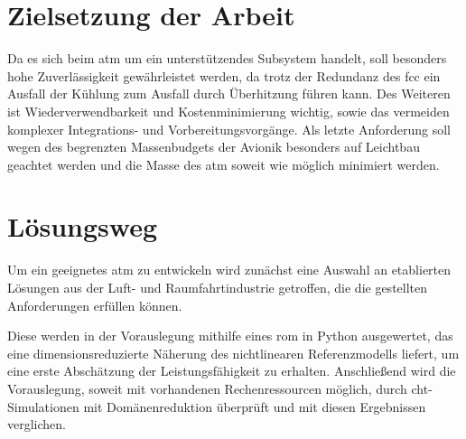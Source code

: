 \section{Zielsetzung der Arbeit}

Da es sich beim \ac{atm} um ein unterstützendes Subsystem handelt, soll besonders hohe Zuverlässigkeit gewährleistet werden, da trotz der
Redundanz des \ac{fcc} ein Ausfall der Kühlung zum Ausfall durch Überhitzung führen kann.
Des Weiteren ist Wiederverwendbarkeit und Kostenminimierung wichtig, sowie das vermeiden komplexer Integrations- und Vorbereitungsvorgänge.
Als letzte Anforderung soll wegen des begrenzten Massenbudgets der Avionik
besonders auf Leichtbau geachtet werden und die Masse des \ac{atm} soweit wie möglich minimiert werden.

\section{Lösungsweg}

Um ein geeignetes \ac{atm} zu entwickeln wird zunächst eine Auswahl an etablierten Lösungen aus der Luft- und Raumfahrtindustrie
getroffen, die die gestellten Anforderungen erfüllen können.

Diese werden in der Vorauslegung mithilfe eines \ac{rom} in Python ausgewertet, das eine dimensionsreduzierte Näherung des nichtlinearen Referenzmodells liefert, um eine erste Abschätzung der Leistungsfähigkeit zu erhalten.
Anschließend wird die Vorauslegung, soweit mit vorhandenen Rechenressourcen möglich, durch \ac{cht}-Simulationen mit Domänenreduktion
überprüft und mit diesen Ergebnissen verglichen.